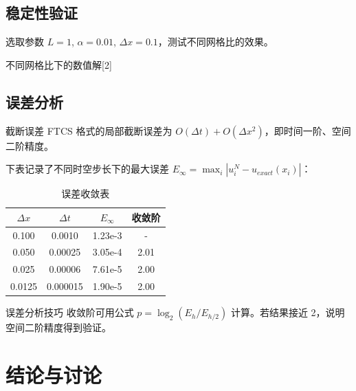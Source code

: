 \documentclass[linux, report,review]{mindflow}
\begin{document}
\subsection{稳定性验证}

选取参数 $L=1$, $\alpha=0.01$, $\Delta x = 0.1$，测试不同网格比的效果。

\begin{figurerow}{不同网格比下的数值解}[2]
\end{figurerow}

\subsection{误差分析}

\begin{theoremnew}{截断误差}
    FTCS 格式的局部截断误差为 $O(\Delta t) + O(\Delta x^2)$，即时间一阶、空间二阶精度。
\end{theoremnew}

下表记录了不同时空步长下的最大误差 $E_\infty = \max_{i} |u_i^N - u_{exact}(x_i)|$：

\begin{table}[H]
    \centering
    \caption{误差收敛表}
    \begin{tabular}{cccc}
        \toprule
        $\Delta x$ & $\Delta t$ & $E_\infty$ & 收敛阶 \\
        \midrule
        0.100 & 0.0010 & 1.23e-3 & - \\
        0.050 & 0.00025 & 3.05e-4 & 2.01 \\
        0.025 & 0.00006 & 7.61e-5 & 2.00 \\
        0.0125 & 0.000015 & 1.90e-5 & 2.00 \\
        \bottomrule
    \end{tabular}
\end{table}

\begin{tip}{误差分析技巧}
    收敛阶可用公式 $p = \log_2(E_h / E_{h/2})$ 计算。若结果接近 2，说明空间二阶精度得到验证。
\end{tip}

\section{结论与讨论}
\end{document}
